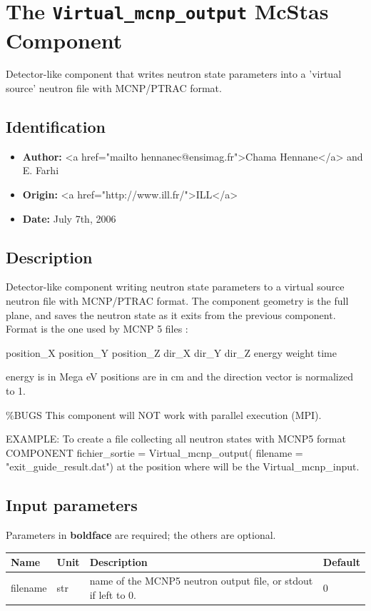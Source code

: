 \section{The \texttt{Virtual\_mcnp\_output} McStas Component}
Detector-like component that writes neutron state parameters into a
'virtual source' neutron file with MCNP/PTRAC format.

\subsection*{Identification}
\begin{itemize}
  \item \textbf{Author:} \textless{}a href="mailto hennanec@ensimag.fr"\textgreater{}Chama Hennane\textless{}/a\textgreater{} and E. Farhi
  \item \textbf{Origin:} \textless{}a href="http://www.ill.fr/"\textgreater{}ILL\textless{}/a\textgreater{}
  \item \textbf{Date:} July 7th, 2006
\end{itemize}

\subsection*{Description}
Detector-like component writing neutron state parameters to a virtual source neutron file with MCNP/PTRAC format. The component geometry is the full plane, and saves the neutron state as it exits from the previous component. Format is the one used by MCNP 5 files :

position\_X position\_Y position\_Z dir\_X dir\_Y dir\_Z energy weight time

energy is in Mega eV positions are in cm and the direction vector is normalized to 1.

\%BUGS This component will NOT work with parallel execution (MPI).

EXAMPLE: To create a file collecting all neutron states with MCNP5 format COMPONENT fichier\_sortie = Virtual\_mcnp\_output( filename = "exit\_guide\_result.dat") at the position where will be the Virtual\_mcnp\_input.

\subsection*{Input parameters}
Parameters in \textbf{boldface} are required; the others are optional.

\begin{longtable}{p{}p{}p{}p{}}
\toprule
\textbf{Name} & \textbf{Unit} & \textbf{Description} & \textbf{Default} \\
\midrule
\endhead
filename & str & name of the MCNP5 neutron output file, or stdout if left to 0. & 0 \\
\bottomrule
\end{longtable}

